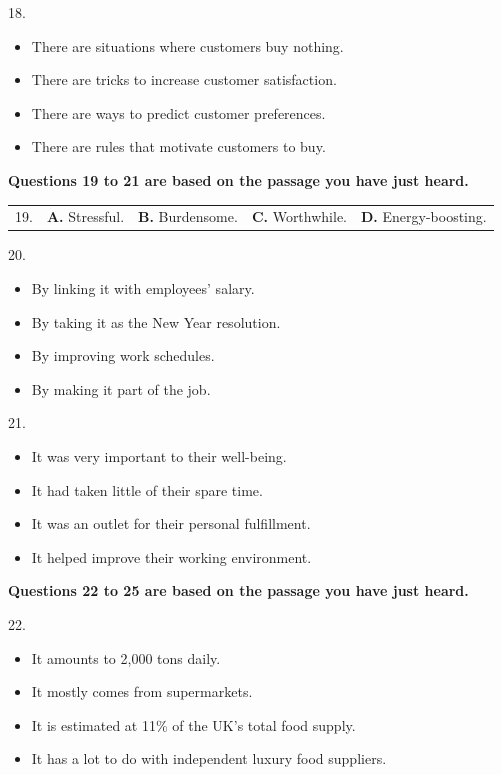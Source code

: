 \documentclass[UTF8,11pt]{ctexart}
\begin{document}
18.


\begin{itemize}[leftmargin=2em,itemsep=.2em,topsep=.4em]\item[A.] There are situations where customers buy nothing.
\item[B.] There are tricks to increase customer satisfaction.
\item[C.] There are ways to predict customer preferences.
\item[D.] There are rules that motivate customers to buy.
\end{itemize}

\textbf{Questions 19 to 21 are based on the passage you have just heard.}


\noindent\begin{tabularx}{\linewidth}{@{}lXXXX@{}}19. & \textbf{A.} Stressful. & \textbf{B.} Burdensome. & \textbf{C.} Worthwhile. & \textbf{D.} Energy-boosting.\\\end{tabularx}\par

20.


\begin{itemize}[leftmargin=2em,itemsep=.2em,topsep=.4em]\item[A.] By linking it with employees’ salary.
\item[B.] By taking it as the New Year resolution.
\item[C.] By improving work schedules.
\item[D.] By making it part of the job.
\end{itemize}

21.


\begin{itemize}[leftmargin=2em,itemsep=.2em,topsep=.4em]\item[A.] It was very important to their well-being.
\item[B.] It had taken little of their spare time.
\item[C.] It was an outlet for their personal fulfillment.
\item[D.] It helped improve their working environment.
\end{itemize}

\textbf{Questions 22 to 25 are based on the passage you have just heard.}


22.


\begin{itemize}[leftmargin=2em,itemsep=.2em,topsep=.4em]\item[A.] It amounts to 2,000 tons daily.
\item[B.] It mostly comes from supermarkets.
\item[C.] It is estimated at 11\% of the UK’s total food supply.
\item[D.] It has a lot to do with independent luxury food suppliers.
\end{itemize}
\end{document}
